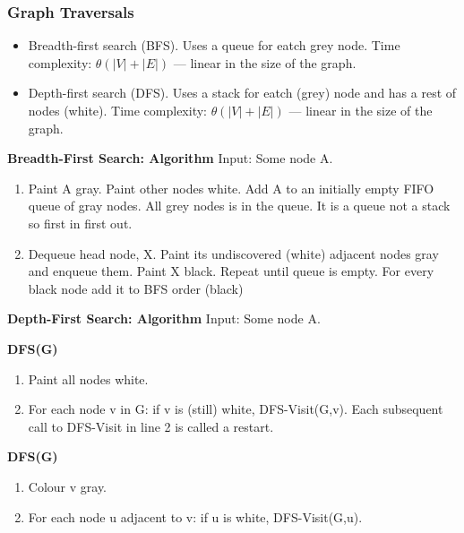 \begin{multicols}{2}
\subsubsection{Graph Traversals}
\begin{itemize}
\item Breadth-first search (BFS). Uses a queue for eatch grey node. \newline
  Time complexity: $\theta(|V|+|E|)$  — linear in the size of the graph.
\item Depth-first search (DFS). Uses a stack for eatch (grey) node and has a rest of nodes (white). \newline
  Time complexity: $\theta(|V|+|E|)$  — linear in the size of the graph.
\end{itemize}

\noindent\textbf{Breadth-First Search: Algorithm} \newline
Input: Some node A.
\begin{enumerate}
\item Paint A gray. Paint other nodes white. Add A to an initially empty FIFO queue of gray nodes.
  All grey nodes is in the queue. It is a queue not a stack so first in first out. 
\item Dequeue head node, X. Paint its undiscovered (white) adjacent nodes gray and enqueue them.
  Paint X black. Repeat until queue is empty. For every black node add it to BFS order (black)
\end{enumerate}

\noindent\textbf{Depth-First Search: Algorithm} \newline
Input: Some node A. \newline

\noindent\textbf{DFS(G)}
\begin{enumerate}
\item Paint all nodes white.
\item For each node v in G: if v is (still) white, DFS-Visit(G,v).
  Each subsequent call to DFS-Visit in line 2 is called a restart.
\end{enumerate}

\noindent\textbf{DFS(G)}
\begin{enumerate}
\item Colour v gray.
\item For each node u adjacent to v: if u is white, DFS-Visit(G,u).
\end{enumerate}



\end{multicols}
